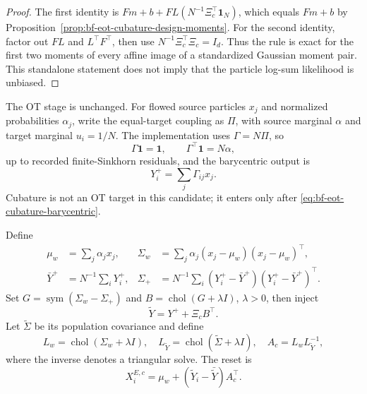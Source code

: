 \begin{proof}
The first identity is \(F m+b+FL(N^{-1}\Xi_c^\top\mathbf 1_N)\),
which equals \(Fm+b\) by Proposition~\ref{prop:bf-eot-cubature-design-moments}.
For the second identity, factor out \(FL\) and \(L^\top F^\top\), then use
\(N^{-1}\Xi_c^\top\Xi_c=I_d\).  Thus the rule is exact for the first two
moments of every affine image of a standardized Gaussian moment pair.  This
standalone statement does not imply that the particle log-sum likelihood is
unbiased.
\end{proof}

The OT stage is unchanged.  For flowed source particles \(x_j\) and normalized
probabilities \(\alpha_j\), write the equal-target coupling as \(\Pi\), with
source marginal \(\alpha\) and target marginal \(u_i=1/N\).  The implementation
uses \(\Gamma=N\Pi\), so
\begin{equation}
\label{eq:bf-eot-cubature-marginals}
 \Gamma\mathbf1=\mathbf1,
 \qquad
 \Gamma^\top\mathbf1=N\alpha,
\end{equation}
up to recorded finite-Sinkhorn residuals, and the barycentric output is
\begin{equation}
\label{eq:bf-eot-cubature-barycentric}
 Y_i^+=\sum_j\Gamma_{ij}x_j.
\end{equation}
Cubature is not an OT target in this candidate; it enters only after
\eqref{eq:bf-eot-cubature-barycentric}.

Define
\begin{align}
 \mu_w&=\sum_j\alpha_jx_j,&
 \Sigma_w&=\sum_j\alpha_j(x_j-\mu_w)(x_j-\mu_w)^\top,\\
 \bar Y^+&=N^{-1}\sum_iY_i^+,&
 \Sigma_+&=N^{-1}\sum_i(Y_i^+-\bar Y^+)(Y_i^+-\bar Y^+)^\top.
\end{align}
Set \(G=\operatorname{sym}(\Sigma_w-\Sigma_+)\) and
\(B=\operatorname{chol}(G+\lambda I)\), \(\lambda>0\), then inject
\begin{equation}
\label{eq:bf-eot-cubature-injected}
 \widetilde Y=Y^++\Xi_cB^\top.
\end{equation}
Let \(\widetilde\Sigma\) be its population covariance and define
\begin{equation}
\label{eq:bf-eot-cubature-affine}
 L_w=\operatorname{chol}(\Sigma_w+\lambda I),\quad
 L_{\widetilde Y}=\operatorname{chol}(\widetilde\Sigma+\lambda I),\quad
 A_c=L_wL_{\widetilde Y}^{-1},
\end{equation}
where the inverse denotes a triangular solve.  The reset is
\begin{equation}
 X_i^{E,c}=\mu_w+(\widetilde Y_i-\bar{\widetilde Y})A_c^\top.
\end{equation}

